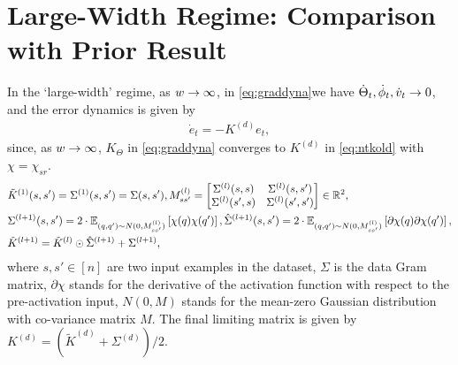 \section{Large-Width Regime: Comparison with Prior Result}\label{sec:exact}
In the `large-width' regime, as $w\rightarrow\infty$, in \eqref{eq:graddyna}we have $\dot{\Theta}_t, \dot{\phi}_t, \dot{v}_t\rightarrow 0$, and the error dynamics is given by
\begin{align}
\dot{e}_t=-K^{(d)} e_t,
\end{align}
since, as $w\rightarrow\infty$, $K_{\Theta}$ in \eqref{eq:graddyna} converges to $K^{(d)}$ in \eqref{eq:ntkold} with $\chi=\chi_{sr}$. 
\begin{align}\label{eq:ntkold}
&\tilde{K}^{(1)}(s,s')=\Sigma^{(1)}(s,s')=\Sigma(s,s'), M^{(l)}_{ss'}=\left[\begin{matrix}\Sigma^{(l)}(s,s) & \Sigma^{(l)}(s,s')\\ \Sigma^{(l)}(s',s) & \Sigma^{(l)}(s',s')\end{matrix}\right]\in \mathbb{R}^2,\\
&\Sigma^{(l+1)}(s,s')= 2\cdot\mathbb{E}_{(q,q')\sim N(0,M_{ss'}^{(l)})} \left[\chi(q)\chi(q')\right], \hat{\Sigma}^{(l+1)}(s,s')= 2\cdot\mathbb{E}_{(q,q')\sim N(0,M_{ss'}^{(l)})}\left[\partial\chi(q)\partial{\chi}(q')\right],\nonumber\\
&\tilde{K}^{(l+1)}=\tilde{K}^{(l)}\odot \hat{\Sigma}^{(l+1)}+\Sigma^{(l+1)},\nonumber
\end{align}
where $s,s'\in[n]$ are two input examples in the dataset, $\Sigma$ is the data Gram matrix, $\partial{\chi}$ stands for the derivative of the activation function with respect to the pre-activation input, $N(0,M)$ stands for the mean-zero Gaussian distribution with co-variance matrix $M$. The final limiting matrix is given by $K^{(d)}=\left(\tilde{K}^{(d)}+\Sigma^{(d)}\right)/2$. 

